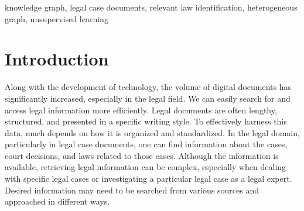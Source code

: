 \documentclass[conference]{IEEEtran}
\begin{document}
\maketitle

\begin{abstract}
This paper presents a knowledge graph construction method for legal case documents and related laws, aiming to organize legal information efficiently and enhance various downstream tasks. Our approach consists of three main steps: data crawling, information extraction, and knowledge graph deployment. First, the data crawler collects a large corpus of legal case documents and related laws from various sources, providing a rich database for further processing. Next, the information extraction step employs natural language processing techniques to extract entities such as courts, cases, domains, and laws, as well as their relationships from the unstructured text. Finally, the knowledge graph is deployed, connecting these entities based on their extracted relationships, creating a heterogeneous graph that effectively represents legal information and caters to users such as lawyers, judges, and scholars. The established baseline model leverages unsupervised learning methods, and by incorporating the knowledge graph, it demonstrates the ability to identify relevant laws for a given legal case. This approach opens up opportunities for various applications in the legal domain, such as legal case analysis, legal recommendation, and decision support.
\end{abstract}

\begin{IEEEkeywords}
knowledge graph, legal case documents, relevant law identification, heterogeneous graph, unsupervised learning
\end{IEEEkeywords}

\section{Introduction}

Along with the development of technology, the volume of digital documents has significantly increased, especially in the legal field. We can easily search for and access legal information more efficiently. Legal documents are often lengthy, structured, and presented in a specific writing style. To effectively harness this data, much depends on how it is organized and standardized. In the legal domain, particularly in legal case documents, one can find information about the cases, court decisions, and laws related to those cases. Although the information is available, retrieving legal information can be complex, especially when dealing with specific legal cases or investigating a particular legal case as a legal expert. Desired information may need to be searched from various sources and approached in different ways.
\end{document}
